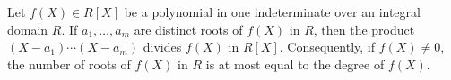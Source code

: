 Let $f(X) \in R[X]$ be a polynomial in one indeterminate over an integral domain $R$. If $a_1, \dots, a_m$ are distinct roots of $f(X)$ in $R$, then the product $(X - a_1) \cdots (X - a_m)$ divides $f(X)$ in $R[X]$. Consequently, if $f(X) \neq 0$, the number of roots of $f(X)$ in $R$ is at most equal to the degree of $f(X)$.
